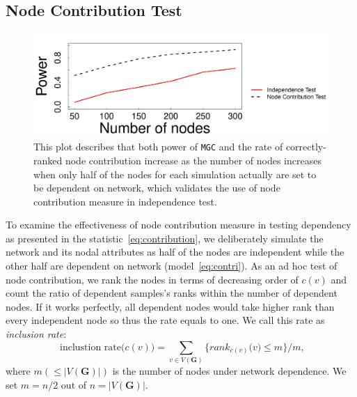 \documentclass[11pt]{article}
\theoremstyle{definition}
\begin{document}
\subsection{Node Contribution Test}
\label{ssec:node}
\begin{figure}[h]
	\centering
	\includegraphics[width=0.7\linewidth]{../Figure/nodecontri.pdf}
	\caption{This plot describes that both power of \texttt{MGC} and the rate of correctly-ranked node contribution increase as the number of nodes increases when only half of the nodes for each simulation actually are set to be dependent on network, which validates the use of node contribution measure in independence test.}
	\label{fig:contribution}
\end{figure}
To examine the effectiveness of node contribution measure in testing dependency as presented in the statistic~\ref{eq:contribution}, we deliberately simulate the network and its nodal attributes as half of the nodes are independent while the other half are dependent on network (model~\ref{eq:contri}). As an ad hoc test of node contribution, we rank the nodes in terms of decreasing order of $c(v)$ and count the ratio of dependent samples's ranks within the number of dependent nodes. If it works perfectly, all dependent nodes would take higher rank than every independent node so thus the rate equals to one. We call this rate as \textit{inclusion rate}:
\begin{equation}
\mbox{ inclustion rate}\big(  c(v) \big) = \sum\limits_{v \in V(\mathbf{G})} \big\{  rank_{c(v)}\big(  v \big)  \leq  m  \big\}   /  m,
\label{eq:inclusion_rate}
\end{equation}
where $m (\leq |V(\mathbf{G})|)$ is the number of nodes under network dependence. We set $m=n/2$ out of $n = |V(\mathbf{G})|$.

\end{document}
